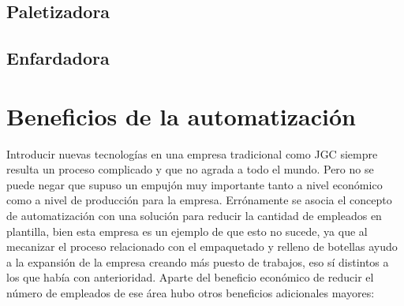 \documentclass[11pt,a4paper,spanish,twoside]{report}
\begin{document}
\section{Paletizadora}
\section{Enfardadora}
\chapter{Beneficios de la automatización}
Introducir nuevas tecnologías en una empresa tradicional como JGC siempre
resulta un proceso complicado y que no agrada a todo el mundo. Pero no se
puede negar que supuso un empujón muy importante tanto a nivel económico como
a nivel de producción para la empresa. Errónamente se asocia el concepto de
automatización con una solución para reducir la cantidad de empleados en
plantilla, bien esta empresa es un ejemplo de que esto no sucede, ya que al
mecanizar el proceso relacionado con el empaquetado y relleno de botellas
ayudo a la expansión de la empresa creando más puesto de trabajos, eso sí
distintos a los que había con anterioridad. Aparte del beneficio económico de
reducir el número de empleados de ese área hubo otros beneficios adicionales
mayores:
\end{document}
